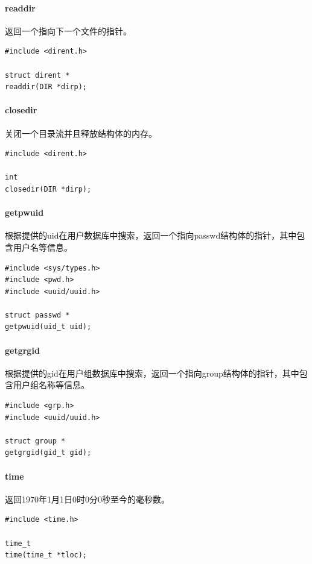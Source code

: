 \documentclass[UTF8,zihao=5,AutoFakeBold]{ctexart}
\begin{document}
\paragraph{readdir\cite{DIRECTORY}}
返回一个指向下一个文件的指针。
\begin{lstlisting}[numbers=none]
#include <dirent.h>

struct dirent *
readdir(DIR *dirp);
\end{lstlisting}

\paragraph{closedir\cite{DIRECTORY}}
关闭一个目录流并且释放结构体的内存。
\begin{lstlisting}[numbers=none]
#include <dirent.h>

int
closedir(DIR *dirp);
\end{lstlisting}

\paragraph{getpwuid\cite{GETPWENT}}
根据提供的uid在用户数据库中搜索，返回一个指向passwd结构体的指针，其中包含用户名等信息。
\begin{lstlisting}[numbers=none]
#include <sys/types.h>
#include <pwd.h>
#include <uuid/uuid.h>

struct passwd *
getpwuid(uid_t uid);
\end{lstlisting}

\paragraph{getgrgid\cite{GETGRENT}}
根据提供的gid在用户组数据库中搜索，返回一个指向group结构体的指针，其中包含用户组名称等信息。
\begin{lstlisting}[numbers=none]
#include <grp.h>
#include <uuid/uuid.h>

struct group *
getgrgid(gid_t gid);
\end{lstlisting}

\paragraph{time\cite{TIME}}
返回1970年1月1日0时0分0秒至今的毫秒数。
\begin{lstlisting}[numbers=none]
#include <time.h>

time_t
time(time_t *tloc);
\end{lstlisting}
\end{document}
